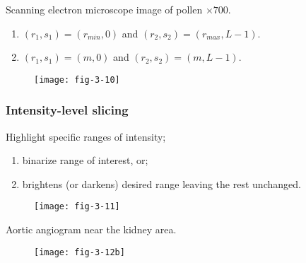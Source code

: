 
\begin{frame}
Scanning electron microscope image of pollen $\times 700$.
\begin{enumerate}
\item $(r_{1},s_{1}) = (r_{min},0)$ and $(r_{2}, s_{2}) = (r_{max}, L-1)$.
\item $(r_{1},s_{1}) = (m,0)$ and $(r_{2}, s_{2}) = (m, L-1)$.
\end{enumerate}
\begin{figure}
\centering
\texttt{[image: fig-3-10]}
\end{figure}\end{frame}


\subsubsection{Intensity-level slicing}


\begin{frame}
Highlight specific ranges of intensity;
\begin{enumerate}
\item binarize range of interest, or;
\item brightens (or darkens) desired range leaving the rest unchanged.
\end{enumerate}
\begin{figure}
\centering
\texttt{[image: fig-3-11]}
\end{figure}
\end{frame}


\begin{frame}
Aortic angiogram near the kidney area.
\begin{figure}
\centering
\texttt{[image: fig-3-12b]}
\end{figure}
\end{frame}


